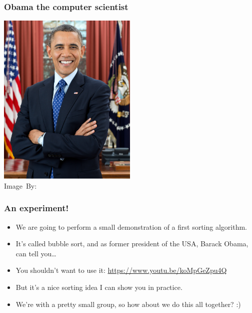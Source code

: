 \begin{frame}
	\frametitle{Obama the computer scientist}
	\begin{center}
		\includegraphics[width=0.5\textwidth,trim={0 9cm 0 0},clip]{figures/obama.jpg}\\
		\hspace*{15pt}\hbox{\scriptsize Image By:}
	\end{center}
\end{frame}

\begin{frame}
	\frametitle{An experiment!}
	
	\begin{itemize}
		\item We are going to perform a small demonstration of a first sorting algorithm.
			\pause
		\item It's called bubble sort, and as former president of the USA, Barack Obama, can tell you\dots
		\item You shouldn't want to use it: \url{https://www.youtu.be/koMpGeZpu4Q}
			\pause
		\item But it's a nice sorting idea I can show you in practice.
		\item We're with a pretty small group, so how about we do this all together? :)
	\end{itemize}
\end{frame}
